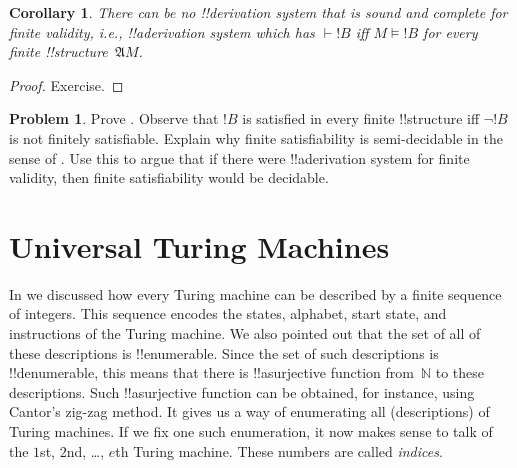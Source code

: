 \documentclass[10pt,a4paper]{article}
\makeatletter
\theoremstyle{plain}
\newtheorem{cor}[thm]{Corollary}
\theoremstyle{definition}
\newtheorem{prob}{Problem}[section]
\theoremstyle{remark}
\newcommand*{\olfileid}[3]{}
\newcommand*{\olsection}[1]{\section*{#1}}
\newcommand*{\olchapter}[3]{}
\newcommand*{\olimport}[1]{}
\newcommand*{\ollabel}[1]{\label{#1}}
\newcommand{\olref}{\@ifnextchar[{\olref@i}{\olref@final}}
\def\olref@i[#1]{\@ifnextchar[{\olref@ii}{\olref@final}}
\def\olref@ii[#1]{\@ifnextchar[{\olref@iii}{\olref@final}}
\def\olref@iii[#1]{\olref@final}
\def\olref@final#1{\ref{#1}}
\providecommand{\Proves}{\mathrel{\vdash}}
\providecommand{\Struct}{\ensuremath{\mathfrak{A}}}
\providecommand{\Sat}[2]{\ensuremath{#1 \models #2}}
\providecommand{\Nat}{\ensuremath{\mathbb{N}}}
\makeatother
\begin{document}
\begin{cor}\ollabel{cor:fproof-incomp}%
  There can be no !!{derivation} system that is sound and complete for
  \emph{finite} validity, i.e., !!a{derivation} system which has $\Proves !B$
  iff $\Sat{M}{!B}$ for every finite !!{structure}~$\Struct{M}$.
\end{cor}

\begin{proof}
  Exercise.
\end{proof}

\begin{prob}
  Prove \olref[tur][und][tra]{cor:fproof-incomp}. Observe that $!B$ is
  satisfied in every finite !!{structure} iff $\lnot !B$ is not
  finitely satisfiable.  Explain why finite satisfiability is
  semi-decidable in the sense of
  \olref[tur][und][uns]{thm:valid-ce}. Use this to argue that if
  there were !!a{derivation} system for finite validity, then finite
  satisfiability would be decidable.
\end{prob}






\olchapter{tur}{und}{Undecidability}

\olimport{introduction}

\olimport{enumerating-tms}

\olimport{universal-tm}

\olimport{halting-problem}

\olimport{decision-problem}

\olimport{representing-tms}

\olimport{verification}

\olimport{unsolvability-decision-problem}

\olimport{trakhtenbrot}

\OLEndChapterHook





\olfileid{tur}{und}{uni}
\olsection{Universal Turing Machines}

In \olref[enu]{sec} we discussed how every Turing machine can be
described by a finite sequence of integers. This sequence encodes the
states, alphabet, start state, and instructions of the Turing machine.
We also pointed out that the set of all of these descriptions is
!!{enumerable}. Since the set of such descriptions is !!{denumerable},
this means that there is !!a{surjective} function from~$\Nat$ to
these descriptions. Such !!a{surjective} function can be obtained, for
instance, using Cantor's zig-zag method.  It gives us a way of
enumerating all (descriptions) of Turing machines. If we fix one such
enumeration, it now makes sense to talk of the $1$st, $2$nd, \dots,
$e$th Turing machine.  These numbers are called \emph{indices}.
\end{document}
